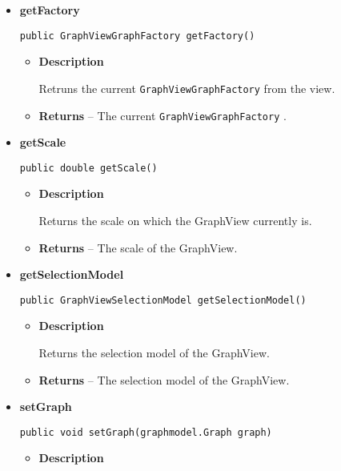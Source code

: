 {{{{{{{\begin{itemize}
{\begin{itemize}
{Adds a grid to the GraphView, on which the dragging can be mapped.
}
\end{itemize}
}%
\item{ 
{\bf  getFactory}\\
\begin{lstlisting}[frame=none]
public GraphViewGraphFactory getFactory()\end{lstlisting} %
\begin{itemize}
\item{
{\bf  Description}

Retruns the current \texttt{\small GraphViewGraphFactory}{\small 
{}} from the view.
}
\item{{\bf  Returns} -- 
The current \texttt{\small GraphViewGraphFactory}{\small 
{}}. 
}%
\end{itemize}
}%
\item{ 
{\bf  getScale}\\
\begin{lstlisting}[frame=none]
public double getScale()\end{lstlisting} %
\begin{itemize}
\item{
{\bf  Description}

Returns the scale on which the GraphView currently is.
}
\item{{\bf  Returns} -- 
The scale of the GraphView. 
}%
\end{itemize}
}%
\item{ 
{\bf  getSelectionModel}\\
\begin{lstlisting}[frame=none]
public GraphViewSelectionModel getSelectionModel()\end{lstlisting} %
\begin{itemize}
\item{
{\bf  Description}

Returns the selection model of the GraphView.
}
\item{{\bf  Returns} -- 
The selection model of the GraphView. 
}%
\end{itemize}
}%
\item{ 
{\bf  setGraph}\\
\begin{lstlisting}[frame=none]
public void setGraph(graphmodel.Graph graph)\end{lstlisting} %
\begin{itemize}
\item{
{\bf  Description}

}
\end{itemize}}
\end{itemize}}}}}}}}
